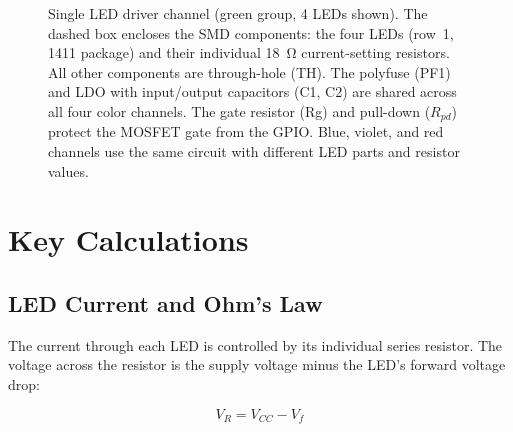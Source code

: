 \documentclass[12pt,letterpaper]{article}
\begin{document}
\begin{figure}[H]
\caption{Single LED driver channel (green group, 4 LEDs shown). The dashed box encloses
the SMD components: the four LEDs (row~1, 1411 package) and their individual 18~\si{\ohm}
current-setting resistors. All other components are through-hole (TH). The polyfuse (PF1)
and LDO with input/output capacitors (C1, C2) are shared across all four color channels.
The gate resistor (Rg) and pull-down ($R_{pd}$) protect the MOSFET gate from the GPIO.
Blue, violet, and red channels use the same circuit with different LED parts and resistor values.}
\label{fig:schematic}
\end{figure}

\section{Key Calculations}

\subsection{LED Current and Ohm's Law}

The current through each LED is controlled by its individual series resistor.
The voltage across the resistor is the supply voltage minus the LED's forward voltage drop:

\begin{equation}
  V_R = V_{CC} - V_f
  \label{eq:vr}
\end{equation}
\end{document}
